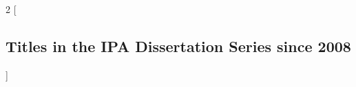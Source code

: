 %
%
%
%
%
%
%
%


\newcommand*{\promitem}[4]{\noindent \textbf{#1}. \emph{#2}. #3.~\mbox{#4}\medskip}

\cleardoublepage \pagestyle{empty}

\setlength{\columnsep}{2em}
\begin{multicols}{2}
        [\subsection*{Titles in the IPA Dissertation Series since 2008}]










\end{multicols}

